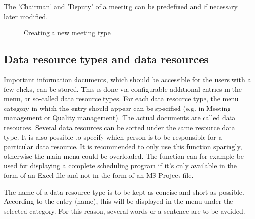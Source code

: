 \vspace{\baselineskip}


The 'Chairman' and 'Deputy' of a meeting can be predefined and if necessary later modified.

\begin{figure}[H]
\caption{Creating a new meeting type}
\end{figure}

\subsection{Data resource types and data resources}

Important information documents, which should be accessible for the users with a few clicks, can be stored. This is done via configurable additional entries in the menu, or so-called data resource types. For each data resource type, the menu category in which the entry should appear can be specified (e.g. in Meeting management or Quality management). The actual documents are called data resources. Several data resources can be sorted under the same resource data type. It is also possible to specify which person is to be responsible for a particular data resource. It is recommended to only use this function sparingly, otherwise the main menu could be overloaded. The function can for example be used for displaying a complete scheduling program if it's only available in the form of an Excel file and not in the form of an MS Project file.

\vspace{\baselineskip}

The name of a data resource type is to be kept as concise and short as possible. According to the entry (name), this will be displayed in the menu under the selected category. For this reason, several words or a sentence are to be avoided.

